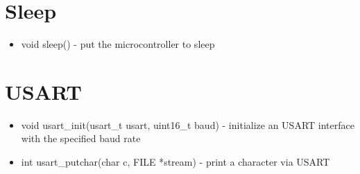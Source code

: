 \section{Sleep}
\begin{itemize}
	\item void sleep() - put the microcontroller to sleep
\end{itemize}

\section{USART}
\begin{itemize}
	\item void usart\_init(usart\_t usart, uint16\_t baud) - initialize an
		USART interface with the specified baud rate
	\item int usart\_putchar(char c, FILE *stream) - print a character via
		USART
\end{itemize}

